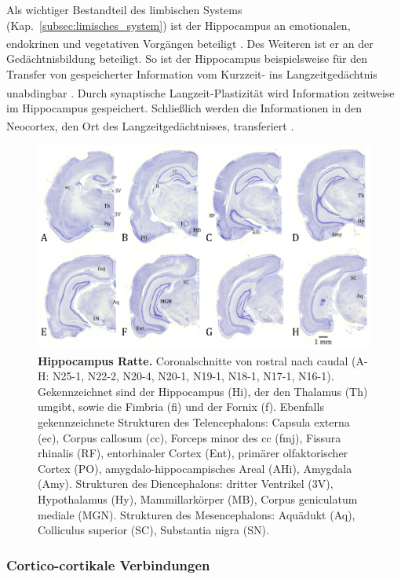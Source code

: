\documentclass[12pt,a4paper,pdftex]{article}
\begin{document}
\noindent Als wichtiger Bestandteil des limbischen Systems (Kap.~\ref{subsec:limisches_system}) ist der Hippocampus an emotionalen, endokrinen und vegetativen Vorgängen beteiligt \textsuperscript{\cite[9]{trepel2011neuroanatomie}}. Des Weiteren ist er an der Gedächtnisbildung beteiligt. So ist der Hippocampus beispielsweise für den Transfer von gespeicherter Information vom Kurzzeit- ins Langzeitgedächtnis unabdingbar \textsuperscript{\cite[6]{storch2012lehrbuchzoo}}. Durch synaptische Langzeit-Plastizität wird Information zeitweise im Hippocampus gespeichert. Schließlich werden die Informationen in den Neocortex, den Ort des Langzeitgedächtnisses, transferiert \textsuperscript{\cite[18]{kandel2013principles}}.

\begin{figure}[H]
    \centering
    \includegraphics[width=\textwidth]{pictures/Bilder_Jule/Ratte/hippocampus.png}
    \caption[Hippocampus Ratte]{\textbf{Hippocampus Ratte.} Coronalschnitte von rostral nach caudal (A-H: N25-1, N22-2, N20-4, N20-1, N19-1, N18-1, N17-1, N16-1). Gekennzeichnet sind der Hippocampus (Hi), der den Thalamus (Th) umgibt, sowie die Fimbria (fi) und der Fornix (f). Ebenfalls gekennzeichnete Strukturen des Telencephalons: Capsula externa (ec), Corpus callosum (cc), Forceps minor des cc (fmj), Fissura rhinalis (RF), entorhinaler Cortex  (Ent), primärer olfaktorischer Cortex (PO), amygdalo-hippocampisches Areal (AHi), Amygdala (Amy). Strukturen des Diencephalons: dritter Ventrikel (3V), Hypothalamus (Hy), Mammillarkörper (MB), Corpus geniculatum mediale (MGN). Strukturen des Mesencephalons: Aquädukt (Aq), Colliculus superior (SC), Substantia nigra (SN).}
    \label{fig:hippocampus_ratte}
\end{figure}{}

\subsubsection*{Cortico-cortikale Verbindungen}
\label{subsubsec:cortico-cortical}
\end{document}
